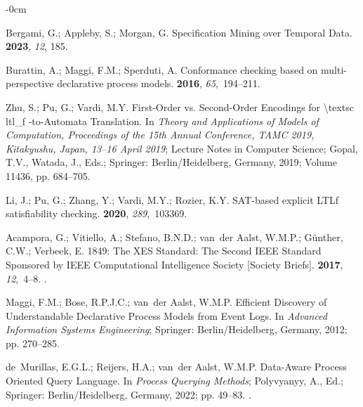 \documentclass[information,article,accept,pdftex,oneauthor]{Definitions/mdpi}
\begin{document}
\begin{adjustwidth}{-\extralength}{0cm}
\begin{thebibliography}{999}
Bergami, G.; Appleby, S.; Morgan, G.
\newblock Specification Mining over Temporal Data.
 {\bf 2023}, {\em 12}, {185}.

Burattin, A.; Maggi, F.M.; Sperduti, A.
\newblock Conformance checking based on multi-perspective declarative process
  models.
 {\bf 2016}, {\em 65},~194--211.

Zhu, S.; Pu, G.; Vardi, M.Y.
\newblock First-Order vs. Second-Order Encodings for {\textbackslash}textsc
  ltl{\_}f -to-Automata Translation.
\newblock In \emph{Theory and Applications of Models of
  Computation, Proceedings of the 15th Annual Conference, {TAMC} 2019, Kitakyushu, Japan,  13--16 April
 2019}; {Lecture Notes in Computer Science}; Gopal, T.V., Watada, J., Eds.; Springer:  {Berlin/Heidelberg, Germany,}  2019; Volume
  11436, pp. 684--705.

Li, J.; Pu, G.; Zhang, Y.; Vardi, M.Y.; Rozier, K.Y.
\newblock SAT-based explicit LTLf satisfiability checking.
 {\bf 2020}, {\em 289},~103369.

Acampora, G.; Vitiello, A.; Stefano, B.N.D.; van~der Aalst, W.M.P.;
  G{\"{u}}nther, C.W.; Verbeek, E.
 1849: The {XES} Standard: The Second {IEEE} Standard Sponsored
  by {IEEE} Computational Intelligence Society [Society Briefs].
 {\bf 2017}, {\em 12},~4--8.
.

Maggi, F.M.; Bose, R.P.J.C.; van~der Aalst, W.M.P.
\newblock Efficient Discovery of Understandable Declarative Process Models from
  Event Logs.
\newblock In \emph{Advanced Information Systems Engineering};
  Springer:  {Berlin/Heidelberg, Germany,}  2012; pp. 270--285.

de~Murillas, E.G.L.; Reijers, H.A.; van~der Aalst, W.M.P.
\newblock Data-Aware Process Oriented Query Language. In {\em Process Querying
  Methods}; Polyvyanyy, A., Ed.; Springer:  {Berlin/Heidelberg, Germany,}   2022; pp. 49--83.
.


\end{thebibliography}
\end{adjustwidth}
\end{document}
